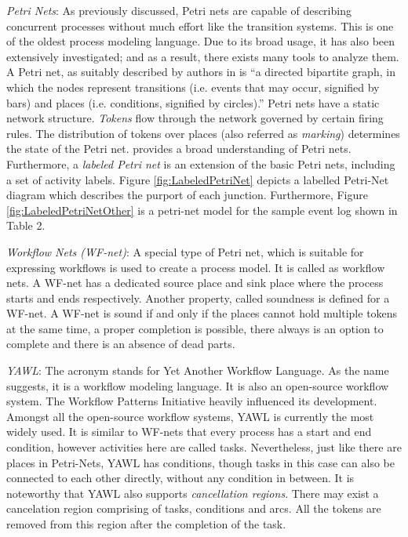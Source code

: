 \textit{Petri Nets}: As previously discussed, Petri nets are capable of describing concurrent processes without much effort like the transition systems. This is one of the oldest process modeling language. Due to its broad usage, it has also been extensively investigated; and as a result, there exists many tools to analyze them\cite{Aalst2015,VanDerAalst2012a,Vossen2012,Aalsta}. A Petri net, as suitably described by authors in\cite{Manoj2012} is “a directed bipartite graph, in which the nodes represent transitions (i.e. events that may occur, signified by bars) and places (i.e. conditions, signified by circles).” Petri nets have a static network structure. \textit{Tokens} flow through the network governed by certain firing rules. The distribution of tokens over places (also referred as \textit{marking}) determines the state of the Petri net. \cite{Petri2008} provides a broad understanding of Petri nets. Furthermore, a \textit{labeled Petri net} is an extension of the basic Petri nets, including a set of activity labels. Figure \ref{fig:LabeledPetriNet} depicts a labelled Petri-Net diagram which describes the purport of each junction. Furthermore, Figure \ref{fig:LabeledPetriNetOther} is a petri-net model for the sample event log shown in Table 2.


\textit{Workflow Nets (WF-net)}: A special type of Petri net, which is suitable for expressing workflows is used to create a process model. It is called as workflow nets\cite{VanderAalst2002}. A WF-net has a dedicated source place and sink place where the process starts and ends respectively. Another property, called soundness is defined for a WF-net. A WF-net is sound if and only if the places cannot hold multiple tokens at the same time, a proper completion is possible, there always is an option to complete and there is an absence of dead parts\cite{VanderAalst2011}.


\textit{YAWL}: The acronym stands for Yet Another Workflow Language. As the name suggests, it is a workflow modeling language. It is also an open-source workflow system. The Workflow Patterns Initiative heavily influenced its development\cite{Hofstede,VanderAalst2003}. Amongst all the open-source workflow systems, YAWL is currently the most widely used. It is similar to WF-nets that every process has a start and end condition, however activities here are called tasks. Nevertheless, just like there are places in Petri-Nets, YAWL has conditions, though tasks in this case can also be connected to each other directly, without any condition in between. It is noteworthy that YAWL also supports \textit{cancellation regions}. There may exist a cancelation region comprising of tasks, conditions and arcs. All the tokens are removed from this region after the completion of the task.


